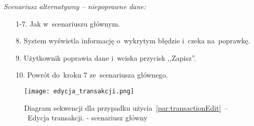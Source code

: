 \textit{Scenariusz alternatywny -- niepoprawne dane:}
\begin{enumerate}
  \item[1-7.] Jak w~scenariuszu głównym.
  \item[8.] System wyświetla informację o~wykrytym błędzie i~czeka na~poprawkę.
  \item[9.] Użytkownik poprawia dane i~wciska przycisk ,,Zapisz''.
  \item[10.] Powrót do~kroku 7 ze~scenariusza głównego.
\end{enumerate}

\begin{figure}[H]
    \texttt{[image: edycja\_transakcji.png]}
    \caption{Diagram sekwencji dla przypadku użycia~\ref{par:transactionEdit}~--~Edycja transakcji.
    - scenariusz główny}
\end{figure}


